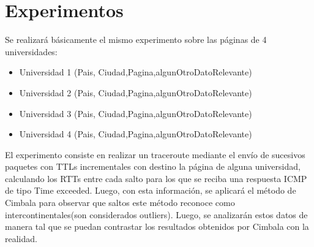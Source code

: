 \section{Experimentos}

Se realizará básicamente el mismo experimento sobre las páginas de 4 universidades:

\begin{itemize}
	\item Universidad 1 (Pais, Ciudad,Pagina,algunOtroDatoRelevante)
	\item Universidad 2 (Pais, Ciudad,Pagina,algunOtroDatoRelevante)
	\item Universidad 3 (Pais, Ciudad,Pagina,algunOtroDatoRelevante)
	\item Universidad 4 (Pais, Ciudad,Pagina,algunOtroDatoRelevante)
\end{itemize}

 El experimento consiste en realizar un traceroute mediante el envío de sucesivos paquetes con TTLs incrementales con destino la página de alguna universidad, calculando los RTTs entre cada salto para los que se reciba una respuesta ICMP de tipo Time exceeded. Luego, con esta información, se aplicará el método de Cimbala para observar que saltos este método reconoce como intercontinentales(son considerados outliers). Luego, se analizarán estos datos de manera tal que se puedan contrastar los resultados obtenidos por Cimbala con la realidad. 
